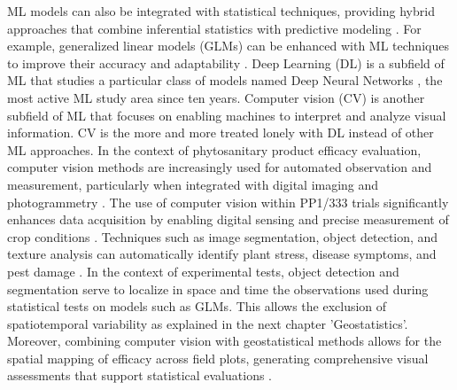 \documentclass[12pt,a4paper,oneside]{report}
\begin{document}
ML models can also be integrated with statistical techniques, providing hybrid approaches 
that combine inferential statistics with predictive modeling \cite{hastieElementsStatisticalLearning2009}. 
For example, generalized linear models (GLMs) can be enhanced with ML techniques to improve 
their accuracy and adaptability \cite{salinasruizGeneralizedLinearMixed2023}. 
Deep Learning (DL) is a subfield of ML that studies a particular class of models named Deep
Neural Networks \cite{goodfellowDeepLearning2016}, the most active ML study area since ten years.
Computer vision (CV) is another subfield of 
ML that focuses on enabling machines to interpret and analyze visual information. 
CV is the more and more treated lonely with DL instead of other ML approaches. In 
the context of phytosanitary product efficacy evaluation, computer vision methods are 
increasingly used for automated observation and measurement, particularly when integrated 
with digital imaging and photogrammetry \cite{luInstanceFusionRealtimeInstancelevel2020}. The use of computer vision 
within PP1/333 trials significantly enhances data acquisition by enabling digital sensing 
and precise measurement of crop conditions \cite{barbedoAutomaticMethodDetect2014,arnalbarbedoDigitalImageProcessing2013}. 
Techniques such as image 
segmentation, object detection, and texture analysis can automatically identify plant stress, 
disease symptoms, and pest damage \cite{kamilarisDeepLearningAgriculture2018}. In the context of experimental tests, object detection and 
segmentation serve to localize in space and time the observations used during statistical tests on models such as GLMs.
This allows the exclusion of spatiotemporal variability as explained in the next chapter 'Geostatistics'.
Moreover, combining computer 
vision with geostatistical methods allows for the spatial mapping of efficacy across field plots, 
generating comprehensive visual assessments that support statistical evaluations 
\cite{koldasbayevaChallengesDatadrivenGeospatial2024}.
\end{document}
